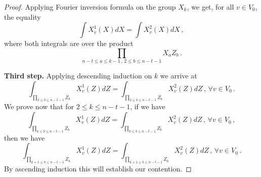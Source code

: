 \documentclass[12pt]{amsart}
\begin{document}
\begin{proof}
Applying Fourier inversion formula on the group $X_k$, we get,
 for all $v \in V_0$, the equality
\[ \int  X_v^1 (X) d X = \int  X_v^2 (X) d X\,, \]
where both integrals are over the product
\[ \prod_{n -t \leq a \leq k-1 \,,\,2 \leq b \leq n-t-1}  X_a Z_b \,.\]

\textbf{Third step.} Applying descending induction on $k$ we arrive at
\[ \int_{\prod_{2 \leq b \leq n-t-1}  Z_b} X_v^1 (Z) d Z = \int_{\prod_{2 \leq b \leq n-t-1}  Z_b} X_v^2 (Z) d Z\,,\, \forall v \in V_0\,. \]
We prove now that for $2\leq k \leq n-t-1$, if we have
\[ \int_{\prod_{ k \leq b \leq n-t-1}Z_b} X_v^1 (Z) d Z = \int_{\prod_{ k \leq b \leq n-t-1}Z_b} X_v^2 (Z) d Z\,,\, \forall v \in V_0\,,\]
then we have 
\[ \int_{\prod_{k+1 \leq b \leq n-t -1} Z_b} X_v^1 (Z) d Z = \int_{\prod_{k+1 \leq b \leq n-t -1} Z_b} X_v^2 (Z) d Z\,,\, \forall v \in V_0\,. \]
By ascending induction this will establish our contention.


\end{proof}
\end{document}
